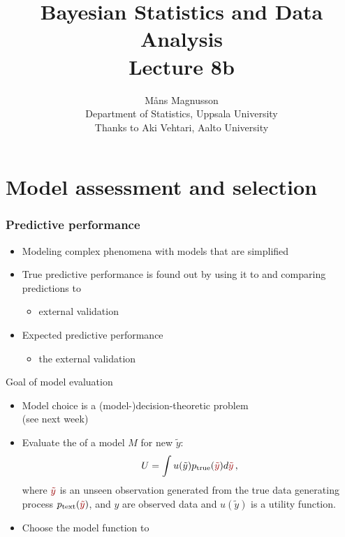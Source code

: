\documentclass[10pt]{beamer}
\title[]{{\color{black}Bayesian Statistics and Data Analysis \\ Lecture 8b}}
\author[]{M{\aa}ns Magnusson \\ Department of Statistics, Uppsala University \\ Thanks to Aki Vehtari, Aalto University}
\date{}
\begin{document}
\frame{\titlepage
}



\section{Model assessment and selection}
\frame{\sectionpage}


\begin{frame}
\frametitle{Predictive performance}

\begin{itemize}
   \item<1-> Modeling complex phenomena with models that are simplified\\
  \item<2-> True predictive performance is found out by using it to  and comparing predictions to 
    \begin{itemize}
      \item external validation
    \end{itemize}
  \item<3-> Expected predictive performance
    \begin{itemize}
      \item {} the external validation
    \end{itemize}
\end{itemize}

\end{frame}



\begin{frame}{Goal of model evaluation}

\begin{itemize}
\item Model choice is a (model-)decision-theoretic problem \\ (see next week)
\item Evaluate the  of a model $M$ for new  $\tilde{y}$:
\[
U = \int u(\tilde{y}) p_\text{true}({\color{uured}\tilde{y}}) d{\color{uured}\tilde{y}}\,,
\]
where ${\color{uured}\tilde{y}}$ is an unseen observation generated from the true data generating process $p_\text{text}({\color{uured}\tilde{y}})$, and $y$ are observed data and $u(\tilde{y})$ is a utility function.
\pause
  \item Choose the model function to 
\end{itemize}
\end{frame}
\end{document}
